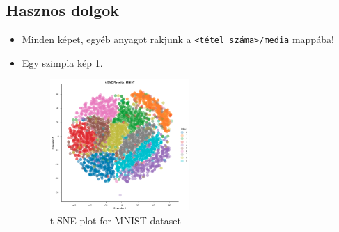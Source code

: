 \documentclass[12pt]{article}
\theoremstyle{plain}
\begin{document}
\subsection{Hasznos dolgok}
\begin{itemize}

    \item Minden képet, egyéb anyagot rakjunk a \texttt{<tétel száma>/media} mappába!
    \item Egy szimpla kép \ref{fig:tsneplot}.
    \begin{figure}[H]
        \begin{center}
        \includegraphics[width=0.5\textwidth]{media/tsneplot.png}
        \caption{t-SNE plot for MNIST dataset \cite{tsne-article}} 
        \label{fig:tsneplot}
        \end{center}
    \end{figure}


\end{itemize}
\end{document}

